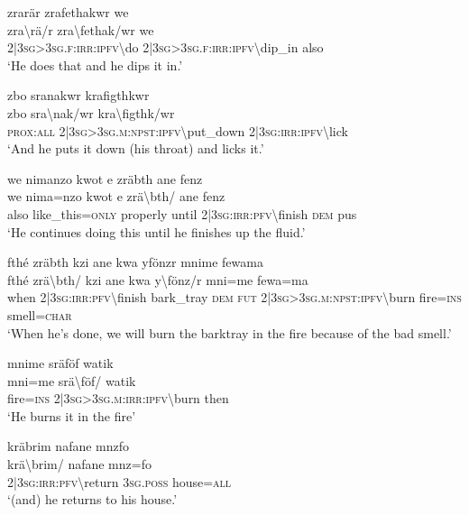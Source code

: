 \ea\label{ex:a4325}
zrarär zrafethakwr we\\
\gll zra{\textbackslash}rä/r	zra{\textbackslash}fethak/wr	we\\
     2|3\textsc{sg}>3\textsc{sg}.\textsc{f}:\textsc{irr}:\textsc{ipfv}{\textbackslash}do	2|3\textsc{sg}>3\textsc{sg}.\textsc{f}:\textsc{irr}:\textsc{ipfv}{\textbackslash}dip\_in	also\\
\glt `He does that and he dips it in.'
\z

\ea\label{ex:a4327}
zbo sranakwr krafigthkwr\\
\gll zbo	sra{\textbackslash}nak/wr	kra{\textbackslash}figthk/wr\\
     \textsc{prox}:\textsc{all}	2|3\textsc{sg}>3\textsc{sg}.\textsc{m}:\textsc{npst}:\textsc{ipfv}{\textbackslash}put\_down	2|3\textsc{sg}:\textsc{irr}:\textsc{ipfv}{\textbackslash}lick\\
\glt `And he puts it down (his throat) and licks it.'
\z

\ea\label{ex:a4329}
we nimanzo kwot e zräbth ane fenz\\
\gll we	nima=nzo	kwot	e	zrä{\textbackslash}bth/	ane	fenz\\
     also	like\_this=\textsc{only}	properly	until	2|3\textsc{sg}:\textsc{irr}:\textsc{pfv}{\textbackslash}finish	\textsc{dem}	pus\\
\glt `He continues doing this until he finishes up the fluid.'
\z

\ea\label{ex:a4330}
fthé zräbth kzi ane kwa yfönzr mnime fewama\\
\gll fthé	zrä{\textbackslash}bth/	kzi	ane	kwa	y{\textbackslash}fönz/r	mni=me	fewa=ma\\
     when	2|3\textsc{sg}:\textsc{irr}:\textsc{pfv}{\textbackslash}finish	bark\_tray	\textsc{dem}	\textsc{fut}	2|3\textsc{sg}>3\textsc{sg}.\textsc{m}:\textsc{npst}:\textsc{ipfv}{\textbackslash}burn	fire=\textsc{ins}	smell=\textsc{char}\\
\glt `When he's done, we will burn the barktray in the fire because of the bad smell.'
\z

\ea\label{ex:a4331}
mnime sräföf watik\\
\gll mni=me	srä{\textbackslash}föf/	watik\\
     fire=\textsc{ins}	2|3\textsc{sg}>3\textsc{sg}.\textsc{m}:\textsc{irr}:\textsc{ipfv}{\textbackslash}burn	then\\
\glt `He burns it in the fire'
\z

\ea\label{ex:a4332}
kräbrim nafane mnzfo\\
\gll krä{\textbackslash}brim/	nafane	mnz=fo\\
     2|3\textsc{sg}:\textsc{irr}:\textsc{pfv}{\textbackslash}return	3\textsc{sg}.\textsc{poss}	house=\textsc{all}\\
\glt `(and) he returns to his house.'
\z

